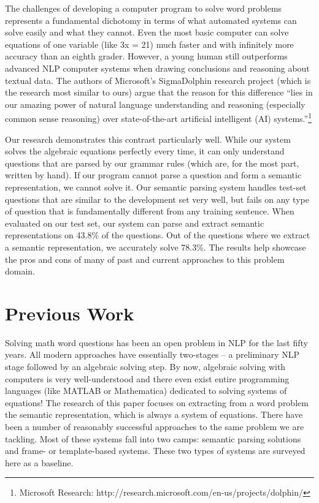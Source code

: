\documentclass[11pt]{article}
\begin{document}
The challenges of developing a computer program to solve word problems represents a fundamental dichotomy in terms of what automated systems can solve easily and what they cannot. Even the most basic computer can solve equations of one variable (like 3x = 21) much faster and with infinitely more accuracy than an eighth grader. However, a young human still outperforms advanced NLP computer systems when drawing conclusions and reasoning about textual data. The authors of Microsoft's SigmaDolphin research project (which is the research most similar to ours) argue that the reason for this difference ``lies in our amazing power of natural language understanding and reasoning (especially common sense reasoning) over state-of-the-art artificial intelligent (AI) systems.''\footnote{Microsoft Research: http://research.microsoft.com/en-us/projects/dolphin/}

Our research demonstrates this contrast particularly well. While our system solves the algebraic equations perfectly every time, it can only understand questions that are parsed by our grammar rules (which are, for the most part, written by hand). If our program cannot parse a question and form a semantic representation, we cannot solve it. Our semantic parsing system handles test-set questions that are similar to the development set very well, but fails on any type of question that is fundamentally different from any training sentence. When evaluated on our test set, our system can parse and extract semantic representations on 43.8\% of the questions. Out of the questions where we extract a semantic representation, we accurately solve 78.3\%. The results help showcase the pros and cons of many of past and current approaches to this problem domain.

\section{Previous Work}
Solving math word questions has been an open problem in NLP for the last fifty years. All modern approaches have essentially two-stages -- a preliminary NLP stage followed by an algebraic solving step. By now, algebraic solving with computers is very well-understood and there even exist entire programming languages (like MATLAB or Mathematica) dedicated to solving systems of equations! The research of this paper focuses on extracting from a word problem the semantic representation, which is always a system of equations. There have been a number of reasonably successful approaches to the same problem we are tackling. Most of these systems fall into two camps: semantic parsing solutions and frame- or template-based systems. These two types of systems are surveyed here as a baseline.
\end{document}
